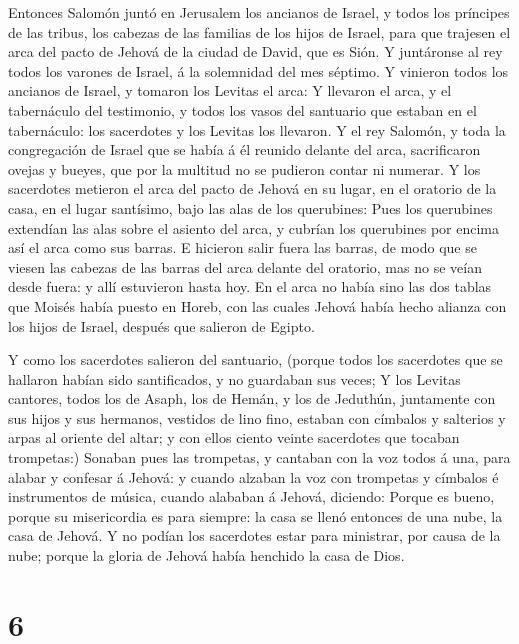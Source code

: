  Entonces Salomón juntó en Jerusalem los ancianos de Israel,
y todos los príncipes de las tribus, los cabezas de las familias de los
hijos de Israel, para que trajesen el arca del pacto de Jehová de la
ciudad de David, que es Sión.  Y juntáronse al rey todos los
varones de Israel, á la solemnidad del mes séptimo.  Y
vinieron todos los ancianos de Israel, y tomaron los Levitas el arca:
 Y llevaron el arca, y el tabernáculo del testimonio, y
todos los vasos del santuario que estaban en el tabernáculo: los
sacerdotes y los Levitas los llevaron.  Y el rey Salomón, y
toda la congregación de Israel que se había á él reunido delante del
arca, sacrificaron ovejas y bueyes, que por la multitud no se pudieron
contar ni numerar.  Y los sacerdotes metieron el arca del
pacto de Jehová en su lugar, en el oratorio de la casa, en el lugar
santísimo, bajo las alas de los querubines:  Pues los
querubines extendían las alas sobre el asiento del arca, y cubrían los
querubines por encima así el arca como sus barras.  E
hicieron salir fuera las barras, de modo que se viesen las cabezas de
las barras del arca delante del oratorio, mas no se veían desde fuera: y
allí estuvieron hasta hoy.  En el arca no había sino las
dos tablas que Moisés había puesto en Horeb, con las cuales Jehová había
hecho alianza con los hijos de Israel, después que salieron de Egipto.

 Y como los sacerdotes salieron del santuario, (porque
todos los sacerdotes que se hallaron habían sido santificados, y no
guardaban sus veces;  Y los Levitas cantores, todos los de
Asaph, los de Hemán, y los de Jeduthún, juntamente con sus hijos y sus
hermanos, vestidos de lino fino, estaban con címbalos y salterios y
arpas al oriente del altar; y con ellos ciento veinte sacerdotes que
tocaban trompetas:)  Sonaban pues las trompetas, y cantaban
con la voz todos á una, para alabar y confesar á Jehová: y cuando
alzaban la voz con trompetas y címbalos é instrumentos de música, cuando
alababan á Jehová, diciendo: Porque es bueno, porque su misericordia es
para siempre: la casa se llenó entonces de una nube, la casa de Jehová.
 Y no podían los sacerdotes estar para ministrar, por causa
de la nube; porque la gloria de Jehová había henchido la casa de Dios.

\hypertarget{section-5}{%
\section{6}\label{section-5}}

